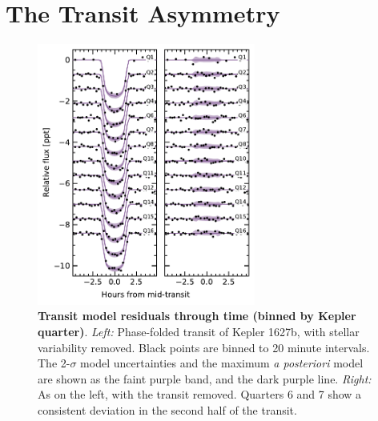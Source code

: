 \documentclass[12pt,modern,twocolumn,tighten]{aastex63}
\begin{document}
\section{The Transit Asymmetry}
\label{app:asymmetry}

\begin{figure}[t]
	\begin{center}
		\leavevmode
		\includegraphics[width=0.64\textwidth]{f9.pdf}
	\end{center}
	\vspace{-0.7cm}
	\caption{
		{\bf Transit model residuals through time (binned by Kepler quarter)}.  
    {\it Left:}
    Phase-folded transit of Kepler 1627b, with stellar variability
    removed.  Black points are binned to 20 minute intervals.  The
    2-$\sigma$ model uncertainties and the maximum {\it a posteriori}
    model are shown as the faint purple band, and the dark purple
    line.
    {\it Right:}
    As on the left, with the transit removed.  Quarters 6 and 7 show a
    consistent deviation in the second half of the transit.
		\label{fig:phasequarter}
	}
\end{figure}
\end{document}
